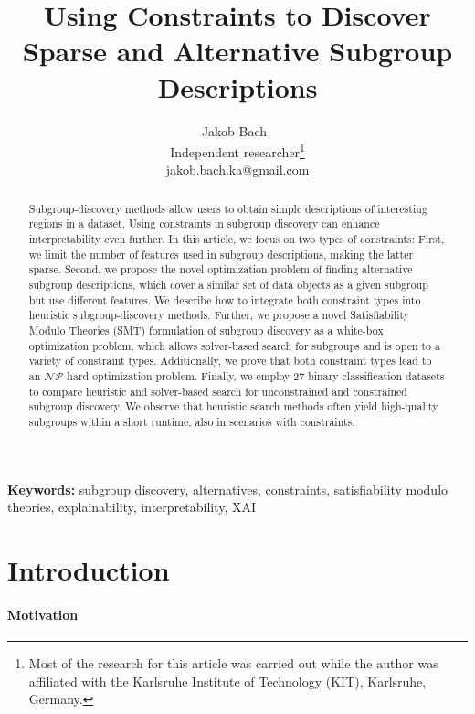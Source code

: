 \documentclass{article}
\title{
	Using Constraints to Discover Sparse and Alternative Subgroup Descriptions
}
\author{
	Jakob Bach~\orcidlink{0000-0003-0301-2798}\\
	\small Independent researcher\footnote{Most of the research for this article was carried out while the author was affiliated with the Karlsruhe Institute of Technology (KIT), Karlsruhe, Germany.}\\
	\small \href{mailto:jakob.bach.ka@gmail.com}{jakob.bach.ka@gmail.com}
}
\date{} %
\theoremstyle{definition}
\begin{document}
\maketitle

\begin{abstract}
Subgroup-discovery methods allow users to obtain simple descriptions of interesting regions in a dataset.
Using constraints in subgroup discovery can enhance interpretability even further.
In this article, we focus on two types of constraints:
First, we limit the number of features used in subgroup descriptions, making the latter sparse.
Second, we propose the novel optimization problem of finding alternative subgroup descriptions, which cover a similar set of data objects as a given subgroup but use different features.
We describe how to integrate both constraint types into heuristic subgroup-discovery methods.
Further, we propose a novel Satisfiability Modulo Theories (SMT) formulation of subgroup discovery as a white-box optimization problem, which allows solver-based search for subgroups and is open to a variety of constraint types.
Additionally, we prove that both constraint types lead to an $\mathcal{NP}$-hard optimization problem.
Finally, we employ 27 binary-classification datasets to compare heuristic and solver-based search for unconstrained and constrained subgroup discovery.
We observe that heuristic search methods often yield high-quality subgroups within a short runtime, also in scenarios with constraints.
\end{abstract}
%
\textbf{Keywords:} subgroup discovery, alternatives, constraints, satisfiability modulo theories, explainability, interpretability, XAI

\section{Introduction}
\label{sec:csd:introduction}

\paragraph{Motivation}
\end{document}
